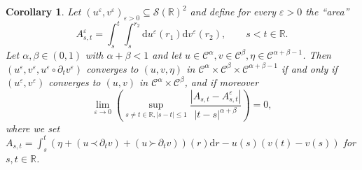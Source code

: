 \documentclass[a4paper,11pt]{article}
\newcommand{\mathd}{\mathrm{d}}
\newtheorem{corollary}[theorem]{Corollary}
\theoremstyle{remark}
\newcommand{\R}{\mathbb{R}}
\newcommand{\CC}{\ensuremath{\mathscr{C}}}
\newcommand{\CS}{\ensuremath{\mathscr{S}}}
\newcommand{\lpara}{\,\mathord{\prec}\,}
\newcommand{\rpara}{\,\mathord{\succ}\,}
\newcommand{\reso}{\,\mathord{\circ}\,}
\begin{document}
\begin{corollary}\label{corollary:classical rough path}
  Let $( u^{\varepsilon} ,v^{\varepsilon} )_{\varepsilon >0} \subseteq \CS(\R)^2$ and define for every $\varepsilon >0$ the ``area''
  \[
     A^{\varepsilon}_{s,t} = \int_{s}^{t} \int_{s}^{r_{2}} \mathd u^{\varepsilon} ( r_{1} ) \mathd v^{\varepsilon} ( r_{2} ) , \hspace{2em} s<t \in \mathbb{R}.
  \]
  Let $\alpha , \beta \in ( 0,1 )$ with $\alpha + \beta <1$ and let $u \in \CC^\alpha ,v \in \CC^\beta , \eta \in \CC^{\alpha + \beta -1}$. Then $( u^{\varepsilon} ,v^{\varepsilon} ,u^{\varepsilon} \reso \partial_{t} v^{\varepsilon} )$ converges to $( u,v, \eta )$ in $\CC^{\alpha} \times \CC^\beta \times \CC^{\alpha + \beta -1}$ if and only if $( u^{\varepsilon},v^{\varepsilon} )$ converges to $( u,v )$ in $\CC^{\alpha} \times \CC^\beta$, and if moreover
  \begin{equation}\label{eq:classical rough path}
     \lim_{\varepsilon \rightarrow 0} \left( \sup_{s \neq t \in \mathbb{R}, | s-t | \leqslant 1} \frac{| A_{s,t} -A^{\varepsilon}_{s,t} |}{| t-s |^{\alpha + \beta}} \right) =0,
  \end{equation}
  where we set $A_{s,t} = \int_{s}^{t} ( \eta + ( u  \lpara \partial_{t} v ) + ( u \rpara \partial_{t} v ) ) ( r ) \mathd r-u ( s ) ( v ( t ) -v ( s ) ) $ for $s,t \in \mathbb{R}$.
\end{corollary}
\end{document}
